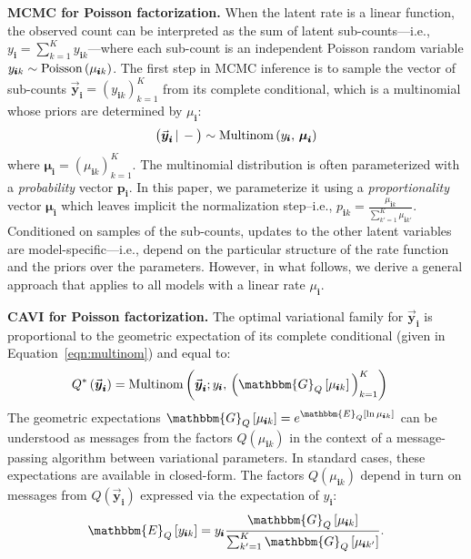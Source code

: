 \documentclass[letterpaper]{article}
\newcommand{\subs}{\pmb{i}}
\newcommand{\ysk}{y_{\subs k}}
\newcommand{\ys}{y_{\subs}}
\newcommand{\mus}{\mu_{\subs}}
\newcommand{\musk}{\mu_{\subs k}}
\newcommand{\yvs}{\vec{\boldsymbol{y}}_{\subs}}
\newcommand{\Multi}[1]{\textup{Multinom}\left( #1 \right)}
\newcommand{\Pois}[1]{\textup{Poisson}\left( #1 \right)}
\newcommand{\Eq}[1]{\mathbbm{E}_Q\left[#1\right]}
\newcommand{\Gq}[1]{\mathbbm{G}_Q\left[#1\right]}
\newcommand{\given}{\,|\,}
\newcommand{\teq}{\!=\!}
\newcommand{\compcond}[1]{\big(#1\given-\big)}
\begin{document}
  \textbf{MCMC for Poisson factorization.} When the latent rate is a linear
  function, the observed count can be interpreted as the sum of latent
  sub-counts---i.e., $\ys = \sum_{k=1}^K \ysk$---where each sub-count is an
  independent Poisson random variable $\ysk \sim \Pois{\musk}$. The first step
  in MCMC inference is to sample the vector of sub-counts $\yvs \teq
  \left(\ysk\right)_{k=1}^K$ from its complete conditional, which is a
  multinomial whose priors are determined by $\mus$:
  \begin{equation}
  \label{eqn:multinom}
  \compcond{\yvs} \sim \Multi{\ys,\, \boldsymbol{\mu}_{\subs}}
  \end{equation}
  where $\boldsymbol{\mu}_{\subs}\teq \left(\musk\right)_{k=1}^K$. The
  multinomial distribution is often parameterized with a \emph{probability}
  vector $\boldsymbol{p}_{\subs}$. In this paper, we parameterize it using a
  \emph{proportionality} vector $\boldsymbol{\mu}_{\subs}$ which leaves implicit
  the normalization step--i.e., $p_{\subs k} = \frac{\musk}{\sum_{k'=1}^K
  \mu_{\subs k'}}$. Conditioned on samples of the sub-counts, updates to the
  other latent variables are model-specific---i.e., depend on the particular
  structure of the rate function and the priors over the parameters. However, in
  what follows, we derive a general approach that applies to all models with a
  linear rate $\mus$. 
  
  \textbf{CAVI for Poisson factorization.} The optimal variational family for
  $\yvs$ is proportional to the geometric expectation of its complete
  conditional (given in Equation~\ref{eqn:multinom}) and equal to:
  \begin{align}
  Q^*\left(\yvs\right) 
  &= \Multi{\yvs; \ys,\, \Big(\Gq{\musk}\Big)_{k=1}^K}
  \end{align}
  The geometric expectations $\Gq{\musk} = e^{\Eq{\ln \musk}}$ can be understood
  as messages from the factors $Q(\musk)$ in the context of a message-passing
  algorithm between variational parameters. In standard cases, these
  expectations are available in closed-form. The factors $Q(\musk)$ depend in
  turn on messages from $Q(\yvs)$ expressed via the expectation of $\ys$:
  \begin{equation}
      \Eq{\ysk}=\ys\frac{\Gq{\musk}}{\sum_{k'=1}^K \Gq{\mu_{\subs k'}}}.
  \end{equation}
  
\end{document}
